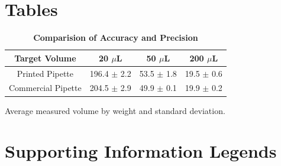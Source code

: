 \section*{Tables}
% 
%
%

\begin{table}[!ht]
\caption{
\bf{Comparision of Accuracy and Precision}}
\begin{tabular}{|c|c|c|c|}
\hline
    Target Volume & 20 $\mu$L & 50 $\mu$L & 200 $\mu$L  \\
    \hline
    Printed Pipette & 196.4 $\pm$ 2.2 & 53.5 $\pm$ 1.8 & 19.5 $\pm$ 0.6 \\
    Commercial Pipette & 204.5 $\pm$ 2.9 & 49.9 $\pm$ 0.1 & 19.9 $\pm$ 0.2 \\
    \hline
\end{tabular}
\begin{flushleft} Average measured volume by weight and standard deviation.
\end{flushleft}
\label{tab:comp}
 \end{table}

\section*{Supporting Information Legends}
%
% 



